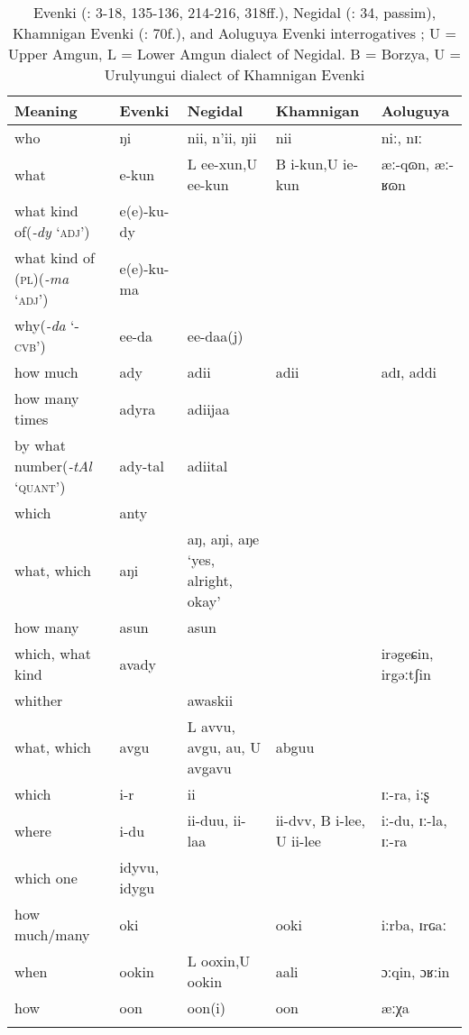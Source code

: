 \begin{table}
\caption{Evenki (\citealt{Nedjalkov1997}: 3-18, 135-136, 214-216, 318ff.), Negidal (\citealt{Cincius1982}: 34, passim), Khamnigan Evenki (\citealt{Janhunen1991}: 70f.), and Aoluguya Evenki interrogatives \citep[171, 238]{Hasibateer2016}; U = Upper Amgun, L = Lower Amgun dialect of Negidal. B = Borzya, U = Urulyungui dialect of Khamnigan Evenki}
\label{tab:tungu:13}

\begin{tabularx}{\textwidth}{QlQQl}
\lsptoprule

\textbf{Meaning} & \textbf{Evenki} & \textbf{Negidal} & \textbf{Khamnigan} & \textbf{Aoluguya}\\
\midrule
who & ŋi & nii, n’ii, ŋii & nii & niː, nɪː\\
what & e-kun & L ee-xun,\newline U ee-kun & B i-kun,\newline U ie-kun & æː-qɷn, æː-ʁɷn\\
what kind of\newline (\textit{-dy} ‘\textsc{adj’}) & e(e)-ku-dy &  & &\\
what kind of (\textsc{pl})\newline (\textit{-ma} ‘\textsc{adj’}) & e(e)-ku-ma &  & &\\
why\newline (\textit{-da} ‘-\textsc{cvb}’) & ee-da & ee-daa(j) & &\\
how much & ady & adii & adii & adɪ, addi\\
how many times & adyra & adiijaa & &\\
by what number\newline (\textit{-}\textit{tA}\textit{l} ‘\textsc{quant}’) & ady-tal & adiital & &\\
which & anty &  & &\\
what, which & aŋi & aŋ, aŋi, aŋe ‘yes, alright, okay’ & &\\
how many & asun & asun & &\\
which, what kind & avady &  & & irəgeɕin, irgəːtʃin\\
whither &  & awaskii & &\\
what, which & avgu & L avvu, avgu, au, U avgavu & abguu &\\
which & i-r & ii & & ɪː-ra, iːʂ\\
where & i-du & ii-duu, ii-laa & ii-dvv, B i-lee, U ii-lee & iː-du, ɪː-la, ɪː-ra\\
which one & idyvu, idygu &  & &\\
how much/many & oki &  & ooki & iːrba, ɪrɢaː\\
when & ookin & L ooxin,\newline U ookin & aali & ɔːqin, ɔʁːin\\
how & oon & oon(i) & oon & æːχa\\
\lspbottomrule
\end{tabularx}
\end{table}

